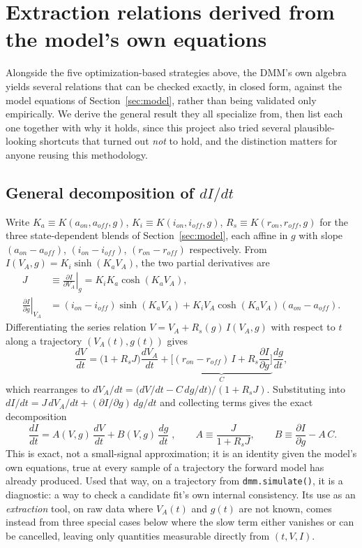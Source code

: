 \documentclass[11pt]{article}
\begin{document}
\section{Extraction relations derived from the model's own equations}
\label{sec:direct}

Alongside the five optimization-based strategies above, the DMM's own
algebra yields several relations that can be checked exactly, in closed
form, against the model equations of Section~\ref{sec:model}, rather than
being validated only empirically. We derive the general result they all
specialize from, then list each one together with why it holds, since this
project also tried several plausible-looking shortcuts that turned out
\emph{not} to hold, and the distinction matters for anyone reusing this
methodology.

\subsection{General decomposition of $dI/dt$}
\label{sec:decomposition}

Write $K_a \equiv K(a_{on},a_{off},g)$, $K_i \equiv K(i_{on},i_{off},g)$,
$R_s \equiv K(r_{on},r_{off},g)$ for the three state-dependent blends of
Section~\ref{sec:model}, each affine in $g$ with slope $(a_{on}-a_{off})$,
$(i_{on}-i_{off})$, $(r_{on}-r_{off})$ respectively. From
$I(V_A,g) = K_i \sinh(K_a V_A)$, the two partial derivatives are
\begin{align}
J &\equiv \left.\frac{\partial I}{\partial V_A}\right|_g = K_i K_a \cosh(K_a V_A), \label{eq:J}\\
\left.\frac{\partial I}{\partial g}\right|_{V_A} &= (i_{on}-i_{off})\sinh(K_a V_A) + K_i V_A \cosh(K_a V_A)(a_{on}-a_{off}). \label{eq:dIdg}
\end{align}
Differentiating the series relation $V = V_A + R_s(g)\,I(V_A,g)$ with
respect to $t$ along a trajectory $(V_A(t), g(t))$ gives
\begin{equation}
\frac{dV}{dt} = \big(1 + R_s J\big)\frac{dV_A}{dt} + \underbrace{\Big[(r_{on}-r_{off})\,I + R_s \frac{\partial I}{\partial g}\Big]}_{\displaystyle C}\frac{dg}{dt},
\end{equation}
which rearranges to $dV_A/dt = \big(dV/dt - C\,dg/dt\big)/(1+R_s J)$. Substituting
into $dI/dt = J\,dV_A/dt + (\partial I/\partial g)\,dg/dt$ and collecting terms gives
the exact decomposition
\begin{equation}
\boxed{\;\frac{dI}{dt} = A(V,g)\,\frac{dV}{dt} + B(V,g)\,\frac{dg}{dt}\;},
\qquad
A \equiv \frac{J}{1+R_s J}, \qquad
B \equiv \frac{\partial I}{\partial g} - A\,C.
\label{eq:decomposition}
\end{equation}
This is exact, not a small-signal approximation; it is an identity given the
model's own equations, true at every sample of a trajectory the forward
model has already produced. Used that way, on a trajectory from
\texttt{dmm.simulate()}, it is a diagnostic: a way to check a candidate
fit's own internal consistency. Its use as an \emph{extraction} tool, on raw
data where $V_A(t)$ and $g(t)$ are not known, comes instead from three
special cases below where the slow term either vanishes or can be
cancelled, leaving only quantities measurable directly from $(t,V,I)$.
\end{document}
